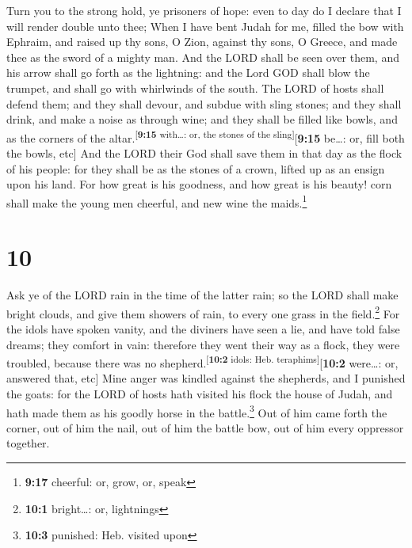  Turn you to the strong hold, ye prisoners of hope: even
to day do I declare that I will render double unto thee; 
When I have bent Judah for me, filled the bow with Ephraim, and raised
up thy sons, O Zion, against thy sons, O Greece, and made thee as the
sword of a mighty man.  And the LORD shall be seen over
them, and his arrow shall go forth as the lightning: and the Lord GOD
shall blow the trumpet, and shall go with whirlwinds of the south.
 The LORD of hosts shall defend them; and they shall
devour, and subdue with sling stones; and they shall drink, and make a
noise as through wine; and they shall be filled like bowls, and as the
corners of the altar.\textsuperscript{{[}\textbf{9:15} with\ldots: or,
the stones of the sling{]}}{[}\textbf{9:15} be\ldots: or, fill both the
bowls, etc{]}  And the LORD their God shall save them in
that day as the flock of his people: for they shall be as the stones of
a crown, lifted up as an ensign upon his land.  For how
great is his goodness, and how great is his beauty! corn shall make the
young men cheerful, and new wine the maids.\footnote{\textbf{9:17}
  cheerful: or, grow, or, speak}

\hypertarget{section-9}{%
\section{10}\label{section-9}}

 Ask ye of the LORD rain in the time of the latter rain;
so the LORD shall make bright clouds, and give them showers of rain, to
every one grass in the field.\footnote{\textbf{10:1} bright\ldots: or,
  lightnings}  For the idols have spoken vanity, and the
diviners have seen a lie, and have told false dreams; they comfort in
vain: therefore they went their way as a flock, they were troubled,
because there was no shepherd.\textsuperscript{{[}\textbf{10:2} idols:
Heb. teraphims{]}}{[}\textbf{10:2} were\ldots: or, answered that, etc{]}
 Mine anger was kindled against the shepherds, and I
punished the goats: for the LORD of hosts hath visited his flock the
house of Judah, and hath made them as his goodly horse in the
battle.\footnote{\textbf{10:3} punished: Heb. visited upon}
 Out of him came forth the corner, out of him the nail,
out of him the battle bow, out of him every oppressor together.

